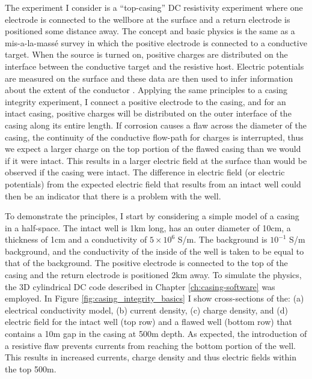 The experiment I consider is a ``top-casing'' DC resistivity experiment where one electrode is connected to the wellbore at the surface and a return electrode is positioned some distance away. The concept and basic physics is the same as a mis-a-la-mass\'e survey in which the positive electrode is connected to a conductive target. When the source is turned on, positive charges are distributed on the interface between the conductive target and the resistive host. Electric potentials are measured on the surface and these data are then used to infer information about the extent of the conductor \citep{Telford1990}. Applying the same principles to a casing integrity experiment, I connect a positive electrode to the casing, and for an intact casing, positive charges will be distributed on the outer interface of the casing along its entire length. If corrosion causes a flaw across the diameter of the casing, the continuity of the conductive flow-path for charges is interrupted, thus we expect a larger charge on the top portion of the flawed casing than we would if it were intact. This results in a larger electric field at the surface than would be observed if the casing were intact. The difference in electric field (or electric potentials) from the expected electric field that results from an intact well could then be an indicator that there is a problem with the well.

To demonstrate the principles, I start by considering a simple model of a casing in a half-space. The intact well is 1km long, has an outer diameter of 10cm, a thickness of 1cm and a conductivity of $5\times10^6$ S/m. The background is $10^{-1}$ S/m background, and the conductivity of the inside of the well is taken to be equal to that of the background. The positive electrode is connected to the top of the casing and the return electrode is positioned 2km away. To simulate the physics, the 3D cylindrical DC code described in Chapter \ref{ch:casing-software} was employed. In Figure \ref{fig:casing_integrity_basics} I show cross-sections of the: (a) electrical conductivity model, (b) current density, (c) charge density, and (d) electric field for the intact well (top row)  and a flawed well (bottom row) that contains a 10m gap in the casing at 500m depth. As expected, the introduction of a resistive flaw prevents currents from reaching the bottom portion of the well. This results in increased currents, charge density and thus electric fields within the top 500m.



